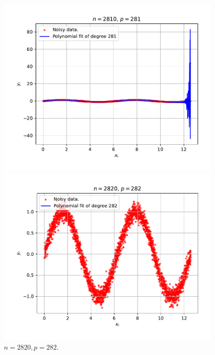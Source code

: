 \begin{figure}[h!]
	\centering
	\begin{minipage}{0.495\textwidth}
		\centering
		\includegraphics[width=\textwidth]{IMAGENES/n_2810_p_281.pdf}
		\caption{$n=2810, p=281$.}
	\end{minipage}
	\hfill
	\begin{minipage}{0.495\textwidth}
		\centering
		\includegraphics[width=\textwidth]{IMAGENES/n_2820_p_282.pdf}
		\caption{$n=2820, p=282$.}
	\end{minipage}
\end{figure}

